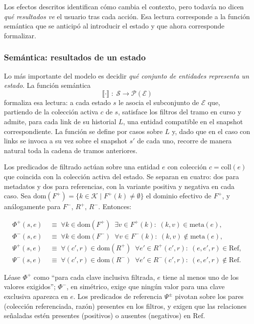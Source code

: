 Los efectos descritos identifican cómo cambia el contexto, pero todavía no dicen \emph{qué resultados ve} el
usuario tras cada acción. Esa lectura corresponde a la función semántica que se anticipó al introducir el
estado y que ahora corresponde formalizar.

\subsubsection*{Semántica: resultados de un estado}

Lo más importante del modelo es decidir \emph{qué conjunto de entidades representa un estado}. La función
semántica
\[
  \llbracket \cdot \rrbracket \;:\; \mathcal{S} \longrightarrow \mathcal{P}(\mathcal{E})
\]
formaliza esa lectura: a cada estado $s$ le asocia el subconjunto de $\mathcal{E}$ que, partiendo de la
colección activa $c$ de $s$, satisface los filtros del tramo en curso y admite, para cada link de su
historial $L$, una entidad compatible en el snapshot correspondiente. La función se define por casos sobre
$L$ y, dado que en el caso con links se invoca a su vez sobre el snapshot $s'$ de cada uno, recorre de manera
natural toda la cadena de tramos anteriores.

Los predicados de filtrado actúan sobre una entidad $e$ con colección $c = \mathrm{coll}(e)$ que coincida con
la colección activa del estado. Se separan en cuatro: dos para metadatos y dos para referencias, con la
variante positiva y negativa en cada caso. Sea $\mathrm{dom}(F^{+}) = \{ k \in \mathcal{K} \mid F^{+}(k) \neq
\emptyset\}$ el dominio efectivo de $F^{+}$, y análogamente para $F^{-}$, $R^{+}$, $R^{-}$. Entonces:

\begin{align*}
  \Phi^{+}(s, e) &\;\equiv\; \forall k \in \mathrm{dom}(F^{+}) \;\; \exists v \in F^{+}(k) :\; (k, v) \in \mathrm{meta}(e),\\
  \Phi^{-}(s, e) &\;\equiv\; \forall k \in \mathrm{dom}(F^{-}) \;\; \forall v \in F^{-}(k) :\; (k, v) \notin \mathrm{meta}(e),\\
  \Psi^{+}(s, e) &\;\equiv\; \forall (c', r) \in \mathrm{dom}(R^{+}) \;\; \forall e' \in R^{+}(c', r) :\; (e, e', r) \in \mathrm{Ref},\\
  \Psi^{-}(s, e) &\;\equiv\; \forall (c', r) \in \mathrm{dom}(R^{-}) \;\; \forall e' \in R^{-}(c', r) :\; (e, e', r) \notin \mathrm{Ref}.
\end{align*}

Léase $\Phi^{+}$ como ``para cada clave inclusiva filtrada, $e$ tiene al menos uno de los valores
exigidos''; $\Phi^{-}$, en simétrico, exige que ningún valor para una clave exclusiva aparezca en $e$.
Los predicados de referencia $\Psi^{\pm}$ pivotan sobre los pares (colección referenciada, razón) presentes
en los filtros, y exigen que las relaciones señaladas estén presentes (positivos) o ausentes (negativos) en
$\mathrm{Ref}$.

